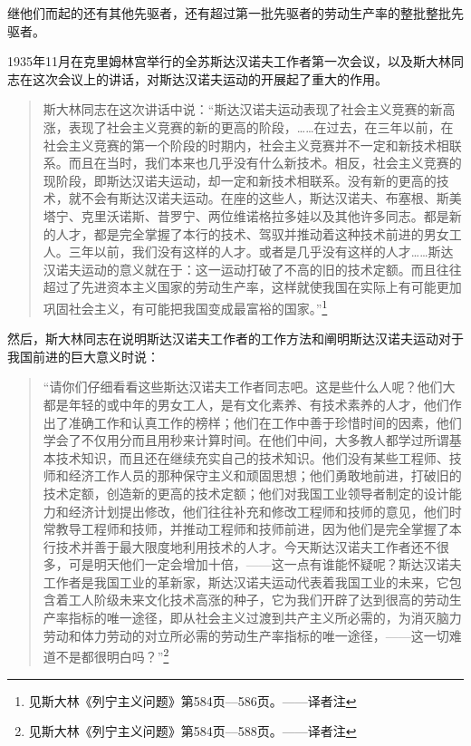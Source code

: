 继他们而起的还有其他先驱者，还有超过第一批先驱者的劳动生产率的整批整批先驱者。

1935年11月在克里姆林宫举行的全苏斯达汉诺夫工作者第一次会议，以及斯大林同志在这次会议上的讲话，对斯达汉诺夫运动的开展起了重大的作用。

\begin{quotation}
斯大林同志在这次讲话中说：“斯达汉诺夫运动表现了社会主义竞赛的新高涨，表现了社会主义竞赛的新的更高的阶段，……在过去，在三年以前，在社会主义竞赛的第一个阶段的时期内，社会主义竞赛并不一定和新技术相联系。而且在当时，我们本来也几乎没有什么新技术。相反，社会主义竞赛的现阶段，即斯达汉诺夫运动，却一定和新技术相联系。没有新的更高的技术，就不会有斯达汉诺夫运动。在座的这些人，斯达汉诺夫、布塞根、斯美塔宁、克里沃诺斯、昔罗宁、两位维诺格拉多娃以及其他许多同志。都是新的人才，都是完全掌握了本行的技术、驾驭并推动着这种技术前进的男女工人。三年以前，我们没有这样的人才。或者是几乎没有这样的人才……斯达汉诺夫运动的意义就在于：这一运动打破了不高的旧的技术定额。而且往往超过了先进资本主义国家的劳动生产率，这样就使我国在实际上有可能更加巩固社会主义，有可能把我国变成最富裕的国家。”\footnote{见斯大林《列宁主义问题》第584页—586页。——译者注}
\end{quotation}

然后，斯大林同志在说明斯达汉诺夫工作者的工作方法和阐明斯达汉诺夫运动对于我国前进的巨大意义时说：

\begin{quotation}
“请你们仔细看看这些斯达汉诺夫工作者同志吧。这是些什么人呢？他们大都是年轻的或中年的男女工人，是有文化素养、有技术素养的人才，他们作出了准确工作和认真工作的榜样；他们在工作中善于珍惜时间的因素，他们学会了不仅用分而且用秒来计算时间。在他们中间，大多教人都学过所谓基本技术知识，而且还在继续充实自己的技术知识。他们没有某些工程师、技师和经济工作人员的那种保守主义和顽固思想；他们勇敢地前进，打破旧的技术定额，创造新的更高的技术定额；他们对我国工业领导者制定的设计能力和经济计划提出修改，他们往往补充和修改工程师和技师的意见，他们时常教导工程师和技师，并推动工程师和技师前进，因为他们是完全掌握了本行技术并善于最大限度地利用技术的人才。今天斯达汉诺夫工作者还不很多，可是明天他们一定会增加十倍，——这一点有谁能怀疑呢？斯达汉诺夫工作者是我国工业的革新家，斯达汉诺夫运动代表着我国工业的未来，它包含着工人阶级未来文化技术高涨的种子，它为我们开辟了达到很高的劳动生产率指标的唯一途径，即从社会主义过渡到共产主义所必需的，为消灭脑力劳动和体力劳动的对立所必需的劳动生产率指标的唯一途径，——这一切难道不是都很明白吗？”\footnote{见斯大林《列宁主义问题》第584页—588页。——译者注}
\end{quotation}

